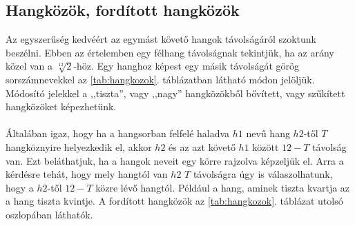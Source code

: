 \subsection{Hangközök, fordított hangközök}
\label{sec:hangkozok}
Az egyszerűség kedvéért az egymást követő  hangok távolságáról szoktunk beszélni. Ebben az értelemben egy félhang távolságnak tekintjük, ha az arány közel van a $\sqrt[12]{2}$-höz. Egy hanghoz képest egy másik távolságát görög sorszámnevekkel az \ref{tab:hangkozok}. táblázatban látható módon jelöljük. Módosító jelekkel a ,,tiszta'', vagy ,,nagy'' hangközökből bővített, vagy szűkített hangközöket képezhetünk. \\\\
Általában igaz, hogy ha a hangsorban felfelé haladva $h1$ nevű hang $h2$-től  $T$ hangköznyire helyezkedik el, akkor $h2$ és az azt követő $h1$ között $12-T$ távolság van. Ezt beláthatjuk, ha a hangok neveit egy körre rajzolva képzeljük el. Arra a kérdésre tehát, hogy mely hangtól van $h2$ $T$ távolságra úgy is válaszolhatunk, hogy a $h2$-től $12-T$ közre lévő hangtól. Például a hang, aminek tiszta kvartja \fisz az a \fisz hang tiszta kvintje. A fordított hangközök az \ref{tab:hangkozok}. táblázat utolsó oszlopában láthatók.
